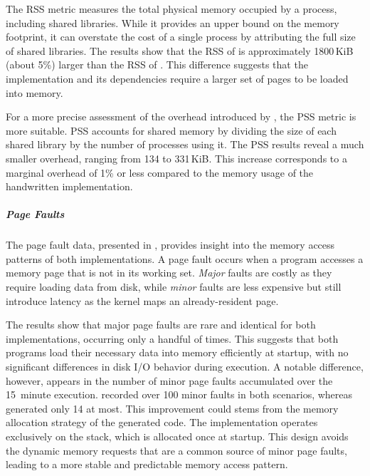 The RSS metric measures the total physical memory occupied by a process, including shared libraries.
While it provides an upper bound on the memory footprint, it can overstate the cost of a single
process by attributing the full size of shared libraries. The results show that the RSS of \disgrust
is approximately 1800\,KiB (about 5\%) larger than the RSS of \dispute. This difference suggests
that the \disgrust implementation and its dependencies require a larger set of pages to be loaded
into memory.

For a more precise assessment of the overhead introduced by \disgrust, the PSS metric is more
suitable. PSS accounts for shared memory by dividing the size of each shared library by the number
of processes using it. The PSS results reveal a much smaller overhead, ranging from 134 to 331\,KiB.
This increase corresponds to a marginal overhead of 1\% or less compared to the memory usage of the
handwritten \dispute implementation.

\subparagraph{Page Faults}

The page fault data, presented in , provides
insight into the memory access patterns of both implementations. A page fault occurs when a program
accesses a memory page that is not in its working set. \emph{Major} faults are costly as they
require loading data from disk, while \emph{minor} faults are less expensive but still introduce
latency as the kernel maps an already-resident page.

The results show that major page faults are rare and identical for both implementations, occurring
only a handful of times. This suggests that both programs load their necessary data into memory
efficiently at startup, with no significant differences in disk I/O behavior during execution.
%
A notable difference, however, appears in the number of minor page faults accumulated over the
15~minute execution. \dispute recorded over 100 minor faults in both scenarios, whereas \disgrust
generated only 14 at most. This improvement could stems from the memory allocation strategy of the
generated code. The \disgrust implementation operates exclusively on the stack, which is allocated
once at startup. This design avoids the dynamic memory requests that are a common source of minor
page faults, leading to a more stable and predictable memory access pattern.

